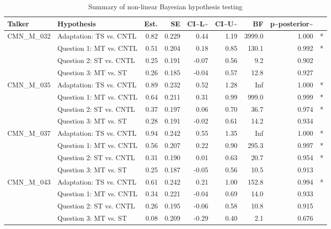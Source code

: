 \begin{table}

\caption{\label{tab:unnamed-chunk-18}Summary of non-linear Bayesian hypothesis testing}
\centering
\begin{tabular}[t]{l|l|r|r|r|r|r|r|l}
\hline
Talker & Hypothesis & Est. & SE & CI\textasciitilde{}L\textasciitilde{} & CI\textasciitilde{}U\textasciitilde{} & BF & p\textasciitilde{}posterior\textasciitilde{} & \\
\hline
CMN\_M\_032 & Adaptation: TS vs. CNTL & 0.82 & 0.229 & 0.44 & 1.19 & 3999.0 & 1.000 & *\\
\hline
 & Question 1: MT vs. CNTL & 0.51 & 0.204 & 0.18 & 0.85 & 130.1 & 0.992 & *\\
\hline
 & Question 2: ST vs. CNTL & 0.25 & 0.191 & -0.07 & 0.56 & 9.2 & 0.902 & \\
\hline
 & Question 3: MT vs. ST & 0.26 & 0.185 & -0.04 & 0.57 & 12.8 & 0.927 & \\
\hline
CMN\_M\_035 & Adaptation: TS vs. CNTL & 0.89 & 0.232 & 0.52 & 1.28 & Inf & 1.000 & *\\
\hline
 & Question 1: MT vs. CNTL & 0.64 & 0.211 & 0.31 & 0.99 & 999.0 & 0.999 & *\\
\hline
 & Question 2: ST vs. CNTL & 0.37 & 0.197 & 0.06 & 0.70 & 36.7 & 0.974 & *\\
\hline
 & Question 3: MT vs. ST & 0.28 & 0.191 & -0.02 & 0.61 & 14.2 & 0.934 & \\
\hline
CMN\_M\_037 & Adaptation: TS vs. CNTL & 0.94 & 0.242 & 0.55 & 1.35 & Inf & 1.000 & *\\
\hline
 & Question 1: MT vs. CNTL & 0.56 & 0.207 & 0.22 & 0.90 & 295.3 & 0.997 & *\\
\hline
 & Question 2: ST vs. CNTL & 0.31 & 0.190 & 0.01 & 0.63 & 20.7 & 0.954 & *\\
\hline
 & Question 3: MT vs. ST & 0.25 & 0.187 & -0.05 & 0.56 & 10.5 & 0.913 & \\
\hline
CMN\_M\_043 & Adaptation: TS vs. CNTL & 0.61 & 0.242 & 0.21 & 1.00 & 152.8 & 0.994 & *\\
\hline
 & Question 1: MT vs. CNTL & 0.34 & 0.221 & -0.04 & 0.69 & 14.0 & 0.933 & \\
\hline
 & Question 2: ST vs. CNTL & 0.26 & 0.195 & -0.06 & 0.58 & 10.8 & 0.915 & \\
\hline
 & Question 3: MT vs. ST & 0.08 & 0.209 & -0.29 & 0.40 & 2.1 & 0.676 & \\
\hline
\end{tabular}
\end{table}
